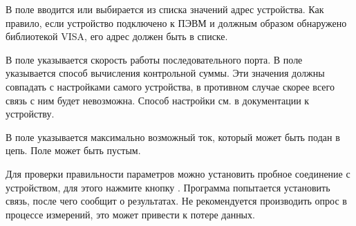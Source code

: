 В поле  вводится или выбирается из списка значений адрес устройства. Как правило, если устройство подключено к ПЭВМ и должным образом обнаружено библиотекой VISA, его адрес должен быть в списке.

В поле  указывается скорость работы последовательного порта. В поле  указывается способ вычисления контрольной суммы. Эти значения должны совпадать с настройками самого устройства, в противном случае скорее всего связь с ним будет невозможна. Способ настройки см. в документации к устройству.


В поле  указывается максимально возможный ток, который может быть подан в цепь. Поле может быть пустым.

\bigskip

Для проверки правильности параметров можно установить пробное соединение с устройством, для этого нажмите кнопку . Программа попытается установить связь, после чего сообщит о результатах. Не рекомендуется производить опрос в процессе измерений, это может привести к потере данных.